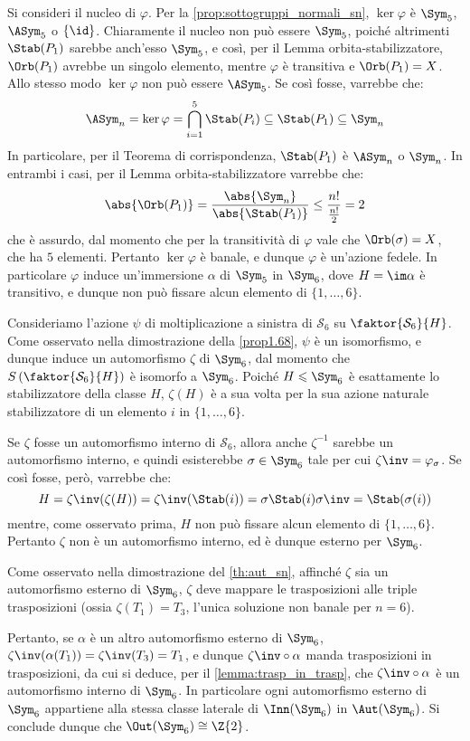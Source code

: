 \documentclass[11pt]{scrartcl}
\begin{document}
	
	Si consideri il nucleo di $\varphi$. Per la \autoref{prop:sottogruppi_normali_sn},
	$\ker \varphi$ è $\Sym_5$, $\ASym_5$ o $\{\id\}$. Chiaramente il nucleo non può
	essere $\Sym_5$, poiché altrimenti $\Stab(P_1)$ sarebbe anch'esso $\Sym_5$, e così,
	per il Lemma orbita-stabilizzatore, $\Orb(P_1)$ avrebbe un singolo elemento, mentre
	$\varphi$ è transitiva e $\Orb(P_1) = X$. Allo stesso modo $\ker \varphi$ non può
	essere $\ASym_5$. Se così fosse, varrebbe che:
	\[ \ASym_n = \ker \varphi = \bigcap_{i=1}^5 \Stab(P_i) \subseteq \Stab(P_1) \subseteq \Sym_n \]
	In particolare, per il Teorema di corrispondenza, $\Stab(P_1)$ è $\ASym_n$ o $\Sym_n$. In entrambi
	i casi,
	per il Lemma orbita-stabilizzatore varrebbe che:
	\[ \abs{\Orb(P_1)} = \frac{\abs{\Sym_n}}{\abs{\Stab(P_1)}} \leq \frac{n!}{\frac{n!}{2}} = 2 \]
	che è assurdo, dal momento che per la transitività di $\varphi$ vale che $\Orb(\sigma) = X$, che ha
	$5$ elementi. Pertanto $\ker \varphi$ è banale, e dunque $\varphi$ è un'azione fedele. In particolare $\varphi$ induce un'immersione $\alpha$ di $\Sym_5$ in
	$\Sym_6$, dove $H = \im \alpha$ è transitivo, e dunque non può fissare
	alcun elemento di $\{1, \ldots, 6\}$. \medskip

	
	Consideriamo l'azione $\psi$ di moltiplicazione a sinistra di $\mathcal{S}_6$ su 
	$\faktor{\mathcal{S}_6}{H}$. Come osservato nella dimostrazione della \autoref{prop1.68},
	$\psi$ è un isomorfismo, e dunque induce un automorfismo $\zeta$ di $\Sym_6$, dal momento che
	$S\left(\faktor{\mathcal{S}_6}{H}\right)$ è isomorfo a $\Sym_6$.
	Poiché $H \leqslant \Sym_6$ è esattamente lo stabilizzatore della
	classe $H$, $\zeta(H)$ è a sua volta per la sua azione naturale
	stabilizzatore di un elemento
	$i$ in $\{1, \ldots, 6\}$. \medskip 


	Se $\zeta$ fosse un automorfismo interno di $\mathcal{S}_6$,
	allora anche $\zeta^{-1}$ sarebbe un automorfismo interno, e quindi
	esisterebbe $\sigma \in \Sym_6$ tale per cui $\zeta\inv = \varphi_\sigma$.
	Se così fosse, però, varrebbe che:
	\[ H = \zeta\inv(\zeta(H)) = \zeta\inv(\Stab(i)) = \sigma \Stab(i) \sigma\inv = \Stab(\sigma(i)) \]
	mentre, come osservato prima, $H$ non può fissare alcun elemento di
	$\{1, \ldots, 6\}$. Pertanto $\zeta$ non è un automorfismo interno,
	ed è dunque esterno per $\Sym_6$.
	
	\begin{remark}
		Come osservato nella dimostrazione del \autoref{th:aut_sn}, affinché
		$\zeta$ sia un automorfismo esterno di $\Sym_6$, $\zeta$ deve mappare
		le trasposizioni alle triple trasposizioni (ossia $\zeta(T_1) = T_3$,
		l'unica soluzione non banale per $n = 6$). \medskip
		
		
		Pertanto, se $\alpha$ è un altro automorfismo esterno di $\Sym_6$,
		$\zeta\inv(\alpha(T_1)) = \zeta\inv(T_3) = T_1$, e dunque
		$\zeta\inv \circ \alpha$ manda trasposizioni in trasposizioni, da cui
		si deduce, per il \autoref{lemma:trasp_in_trasp}, che $\zeta\inv \circ \alpha$
		è un automorfismo interno di $\Sym_6$. In particolare ogni automorfismo esterno
		di $\Sym_6$ appartiene alla stessa classe laterale di $\Inn(\Sym_6)$ in
		$\Aut(\Sym_6)$. Si conclude dunque che $\Out(\Sym_6) \cong \Z{2}$.
	\end{remark}
	
\end{document}
